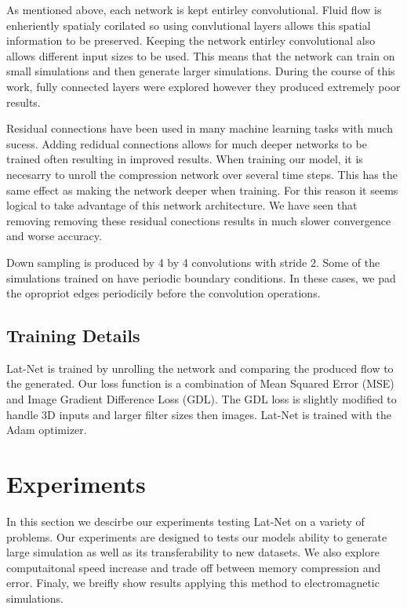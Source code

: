 \documentclass{article}
\begin{document}
As mentioned above, each network is kept entirley convolutional. Fluid flow is enheriently spatialy corilated so using convlutional layers allows this spatial information to be preserved. Keeping the network entirley convolutional also allows different input sizes to be used. This means that the network can train on small simulations and then generate larger simulations. During the course of this work, fully connected layers were explored however they produced extremely poor results.

Residual connections have been used in many machine learning tasks with much sucess. Adding redidual connections allows for much deeper networks to be trained often resulting in improved results. When training our model, it is necesarry to unroll the compression network over several time steps. This has the same effect as making the network deeper when training. For this reason it seems logical to take advantage of this network architecture. We have seen that removing removing these residual conections results in much slower convergence and worse accuracy.

Down sampling is produced by 4 by 4 convolutions with stride 2. Some of the simulations trained on have periodic boundary conditions. In these cases, we pad the opropriot edges periodicily before the convolution operations.


\subsection{Training Details}

Lat-Net is trained by unrolling the network and comparing the produced flow to the generated. Our loss function is a combination of Mean Squared Error (MSE) and Image Gradient Difference Loss (GDL)\cite{mathieu2015deep}. The GDL loss is slightly modified to handle 3D inputs and larger filter sizes then images. Lat-Net is trained with the Adam optimizer\cite{kingma2014adam}.

\section{Experiments}

In this section we descirbe our experiments testing Lat-Net on a variety of problems. Our experiments are designed to tests our models ability to generate large simulation as well as its transferability to new datasets. We also explore computaitonal speed increase and trade off between memory compression and error. Finaly, we breifly show results applying this method to electromagnetic simulations.
\end{document}
